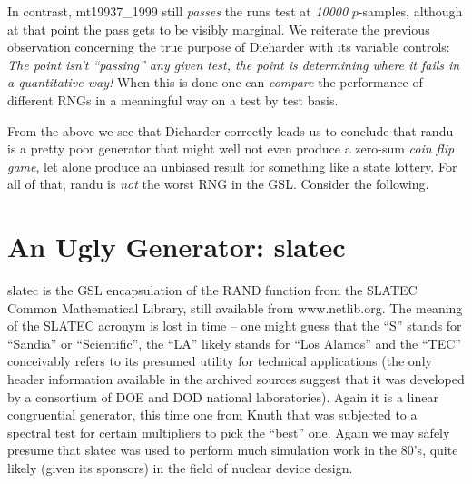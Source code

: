 \documentclass{book}
\begin{document}
In contrast, mt19937\_1999 still {\em passes} the runs test at {\em
10000} $p$-samples, although at that point the pass gets to be visibly
marginal.  We reiterate the previous observation concerning the true
purpose of Dieharder with its variable controls: {\em The point isn't
``passing'' any given test, the point is determining where it fails in a
quantitative way!} When this is done one can {\em compare} the
performance of different RNGs in a meaningful way on a test by test
basis.

From the above we see that Dieharder correctly leads us to conclude that
randu is a pretty poor generator that might well not even produce a
zero-sum {\em coin flip game}, let alone produce an unbiased result for
something like a state lottery.  For all of that, randu is {\em not} the
worst RNG in the GSL.  Consider the following.

\section{An Ugly Generator: slatec}

slatec is the GSL encapsulation of the RAND function from the SLATEC
Common Mathematical Library, still available from
www.netlib.org\cite{slatec}.  The meaning of the SLATEC acronym is lost
in time -- one might guess that the ``S'' stands for ``Sandia'' or
``Scientific'', the ``LA'' likely stands for ``Los Alamos'' and the
``TEC'' conceivably refers to its presumed utility for technical
applications (the only header information available in the archived
sources suggest that it was developed by a consortium of DOE and DOD
national laboratories).  Again it is a linear congruential generator,
this time one from Knuth that was subjected to a spectral test for
certain multipliers to pick the ``best'' one.  Again we may safely
presume that slatec was used to perform much simulation work in the
80's, quite likely (given its sponsors) in the field of nuclear device
design.
\end{document}
